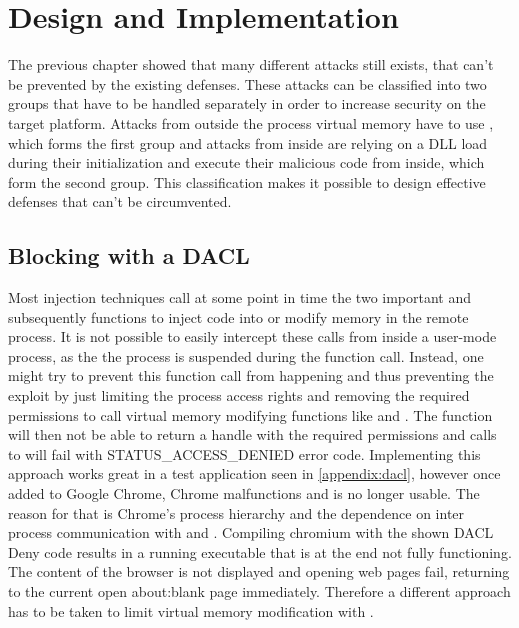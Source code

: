 \section{Design and Implementation}
\label{chap_implementation}
The previous chapter showed that many different attacks still exists, that can't be prevented by the existing defenses. These attacks can be classified into two groups that have to be handled separately in order to increase security on the target platform. Attacks from outside the process virtual memory have to use , which forms the first group and attacks from inside are relying on a DLL load during their initialization and execute their malicious code from inside, which form the second group. This classification makes it possible to design effective defenses that can't be circumvented. 

\subsection{Blocking  with a DACL}
\label{sec:implementation_dacl}
Most injection techniques call at some point in time the two important  and subsequently  functions to inject code into or modify memory in the remote process. It is not possible to easily intercept these calls from inside a user-mode process, as the the process is suspended during the  function call. Instead, one might try to prevent this function call from happening and thus preventing the exploit by just limiting the process access rights and removing the required permissions to call virtual memory modifying functions like  and . The  function will then not be able to return a handle with the required permissions and calls to  will fail with STATUS\_ACCESS\_DENIED error code. Implementing this approach works great in a test application seen in \ref{appendix:dacl}, however once added to Google Chrome, Chrome malfunctions and is no longer usable. The reason for that is Chrome's process hierarchy and the dependence on inter process communication with  and . Compiling chromium with the shown DACL Deny code results in a running executable that is at the end not fully functioning. The content of the browser is not displayed and opening web pages fail, returning to the current open about:blank page immediately. Therefore a different approach has to be taken to limit virtual memory modification with .

